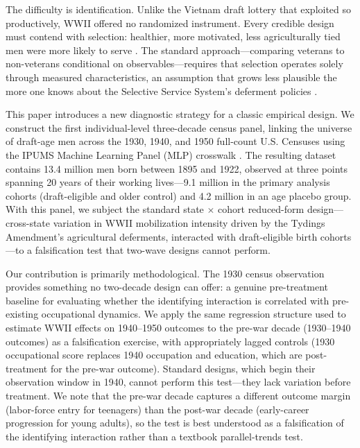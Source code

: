 \documentclass[12pt]{article}
\begin{document}
The difficulty is identification. Unlike the Vietnam draft lottery that \citet{angrist1990} exploited so productively, WWII offered no randomized instrument. Every credible design must contend with selection: healthier, more motivated, less agriculturally tied men were more likely to serve \citep{stouffer1949, angristkrueger1994}. The standard approach---comparing veterans to non-veterans conditional on observables---requires that selection operates solely through measured characteristics, an assumption that grows less plausible the more one knows about the Selective Service System's deferment policies \citep{hershey1947}.

This paper introduces a new diagnostic strategy for a classic empirical design. We construct the first individual-level three-decade census panel, linking the universe of draft-age men across the 1930, 1940, and 1950 full-count U.S. Censuses using the IPUMS Machine Learning Panel (MLP) crosswalk \citep{ruggles2024, price2019}. The resulting dataset contains 13.4 million men born between 1895 and 1922, observed at three points spanning 20 years of their working lives---9.1 million in the primary analysis cohorts (draft-eligible and older control) and 4.2 million in an age placebo group. With this panel, we subject the standard state $\times$ cohort reduced-form design---cross-state variation in WWII mobilization intensity driven by the Tydings Amendment's agricultural deferments, interacted with draft-eligible birth cohorts---to a falsification test that two-wave designs cannot perform.

Our contribution is primarily methodological. The 1930 census observation provides something no two-decade design can offer: a genuine pre-treatment baseline for evaluating whether the identifying interaction is correlated with pre-existing occupational dynamics. We apply the same regression structure used to estimate WWII effects on 1940--1950 outcomes to the pre-war decade (1930--1940 outcomes) as a falsification exercise, with appropriately lagged controls (1930 occupational score replaces 1940 occupation and education, which are post-treatment for the pre-war outcome). Standard designs, which begin their observation window in 1940, cannot perform this test---they lack variation before treatment. We note that the pre-war decade captures a different outcome margin (labor-force entry for teenagers) than the post-war decade (early-career progression for young adults), so the test is best understood as a falsification of the identifying interaction rather than a textbook parallel-trends test.
\end{document}
